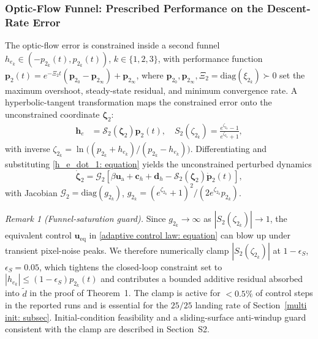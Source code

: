 \subsubsection{Optic-Flow Funnel: Prescribed Performance on the Descent-Rate Error} \label{ppc optic flow: section}
The optic-flow error is constrained inside a second funnel $h_{e_k}\in(-p_{2_k}(t),p_{2_k}(t))$, $k\in\{1,2,3\}$, with performance function $\boldsymbol{p}_2(t) = e^{-\Xi_2 t}(\boldsymbol{p}_{2_0}-\boldsymbol{p}_{2_\infty})+\boldsymbol{p}_{2_\infty}$, where $\boldsymbol{p}_{2_0},\boldsymbol{p}_{2_\infty},\Xi_2=\text{diag}(\xi_{2_k})\succ 0$ set the maximum overshoot, steady-state residual, and minimum convergence rate. A hyperbolic-tangent transformation maps the constrained error onto the unconstrained coordinate $\boldsymbol{\zeta}_2$:
\begin{align}
    \label{optical flow error transformation: equation}
    \boldsymbol{h}_e &= \mathcal{S}_2(\boldsymbol{\zeta}_2)\boldsymbol{p}_2(t),\quad S_2(\zeta_{2_k}) = \frac{e^{\zeta_{2_k}}-1}{e^{\zeta_{2_k}}+1},
\end{align}
with inverse $\zeta_{2_k}=\ln\!\big((p_{2_k}+h_{e_k})/(p_{2_k}-h_{e_k})\big)$. Differentiating and substituting \eqref{h_e_dot_1: equation} yields the unconstrained perturbed dynamics
\begin{equation} \label{unconstrained system: equation}
    \dot{\boldsymbol{\zeta}}_2 = \mathcal{G}_2\!\left[\beta\boldsymbol{u}_\text{a} + \boldsymbol{c}_h + \boldsymbol{d}_h - \mathcal{S}_2(\boldsymbol{\zeta}_2)\dot{\boldsymbol{p}}_2(t)\right],
\end{equation}
with Jacobian $\mathcal{G}_2=\text{diag}(g_{2_k})$, $g_{2_k}=(e^{\zeta_{2_k}}+1)^2/(2e^{\zeta_{2_k}}p_{2_k})$.

\textit{Remark 1 (Funnel-saturation guard).} Since $g_{2_k}\to\infty$ as $|S_2(\zeta_{2_k})|\to 1$, the equivalent control $\boldsymbol{u}_\text{eq}$ in \eqref{adaptive control law: equation} can blow up under transient pixel-noise peaks. We therefore numerically clamp $|S_2(\zeta_{2_k})|$ at $1-\epsilon_S$, $\epsilon_S=0.05$, which tightens the closed-loop constraint set to $|h_{e_k}|\le(1-\epsilon_S)p_{2_k}(t)$ and contributes a bounded additive residual absorbed into $\tilde{d}$ in the proof of Theorem~1. The clamp is active for $<0.5\%$ of control steps in the reported runs and is essential for the $25/25$ landing rate of Section~\ref{multi init: subsec}. Initial-condition feasibility and a sliding-surface anti-windup guard consistent with the clamp are described in Section~S2.

